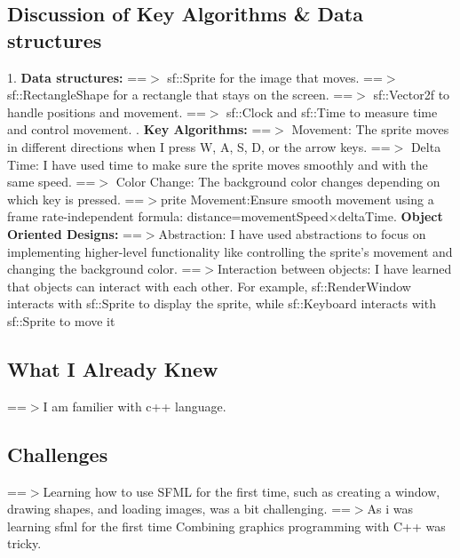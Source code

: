 \documentclass[12pt]{article}
\begin{document}
\subsection{Discussion of Key Algorithms \& Data structures}
1. \textbf{Data structures:}
\newline
==$>$  sf::Sprite for the image that moves.
\newline
==$>$  sf::RectangleShape for a rectangle that stays on the screen.
\newline
==$>$  sf::Vector2f to handle positions and movement.
\newline
==$>$  sf::Clock and sf::Time to measure time and control movement.
. \textbf{Key Algorithms:}
\newline
==$>$  Movement: The sprite moves in different directions when I press W, A, S, D, or the arrow keys.
\newline
==$>$  Delta Time: I have used time to make sure the sprite moves smoothly and with the same speed.
\newline
==$>$  Color Change: The background color changes depending on which key is pressed.
\newline
==$>$prite Movement:Ensure smooth movement using a frame rate-independent formula:
distance=movementSpeed×deltaTime.
\newline
\textbf{Object Oriented Designs:}
\newline
==$>$Abstraction:
\newline
I have used  abstractions to focus on implementing higher-level functionality like controlling the sprite’s movement and changing the background color. 
\newline
==$>$Interaction between objects:
\newline
I have learned that objects can interact with each other. For example, sf::RenderWindow interacts with sf::Sprite to display the sprite, while sf::Keyboard interacts with sf::Sprite to move it
\subsection{What I Already Knew}
==$>$I am familier with c++ language.
\subsection{Challenges}
==$>$Learning how to use SFML for the first time, such as creating a window, drawing shapes, and loading images, was a bit challenging.
\newline
==$>$As i was learning sfml for the first time Combining graphics programming with C++ was tricky.
\end{document}
